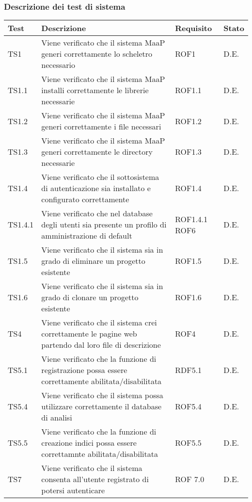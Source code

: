\subsubsection{Descrizione dei test di sistema}
\begin{center}
\begin{longtable}{|p{2cm}|p{7cm}|p{2cm}|p{2cm}|}
\toprule
\textbf{Test} & \textbf{Descrizione} & \textbf{Requisito} & \textbf{Stato}\\
\midrule
TS1 & Viene verificato che il sistema MaaP generi correttamente lo scheletro necessario & ROF1 & D.E.\\
\midrule
TS1.1 & Viene verificato che il sistema MaaP installi correttamente le librerie necessarie & ROF1.1 & D.E.\\
\midrule
TS1.2 & Viene verificato che il sistema MaaP generi correttamente i file necessari & ROF1.2 & D.E.\\
\midrule
TS1.3 & Viene verificato che il sistema MaaP generi correttamente le directory necessarie & ROF1.3 & D.E.\\
\midrule
TS1.4 & Viene verificato che il sottosistema di autenticazione sia installato e configurato correttamente & ROF1.4 & D.E.\\
\midrule
TS1.4.1 & Viene verificato che nel database degli utenti sia presente un profilo di amministrazione di default & ROF1.4.1 ROF6 & D.E.\\
\midrule
TS1.5 & Viene verificato che il sistema sia in grado di eliminare un progetto esistente & ROF1.5 & D.E.\\
\midrule
TS1.6 & Viene verificato che il sistema sia in grado di clonare un progetto esistente & ROF1.6 & D.E.\\
\midrule
TS4 & Viene verificato che il sistema crei correttamente le pagine web partendo dal loro file di descrizione & ROF4 & D.E.\\
\midrule
TS5.1 & Viene verificato che la funzione di registrazione possa essere correttamente abilitata/disabilitata & RDF5.1 & D.E.\\
\midrule
TS5.4 & Viene verificato che il sistema possa utilizzare correttamente il database di analisi & ROF5.4 & D.E.\\
\midrule
TS5.5 & Viene verificato che la funzione di creazione indici possa essere correttamnte abilitata/disabilitata & ROF5.5 & D.E.\\
\midrule
TS7 & Viene verificato che il sistema consenta all'utente registrato di potersi autenticare & ROF 7.0 & D.E.\\

\end{longtable}
\end{center}
